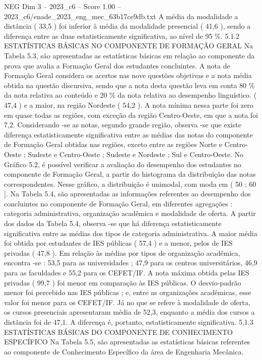 \begin{textsample}{NEG Dim 3 – 2023\_c6 – Score 1.00 – 2023\_c6/enade\_2023\_eng\_mec\_63b17ce9db.txt}
A média da modalidade a distância ( 33,5 ) foi inferior à média da modalidade presencial ( 41,6 ), sendo a diferença entre as duas estatisticamente significativa, ao nível de 95 \%. 5.1.2 ESTATÍSTICAS BÁSICAS NO COMPONENTE DE FORMAÇÃO GERAL Na Tabela 5.3, são apresentadas as estatísticas básicas em relação ao componente da prova que avalia a Formação Geral dos estudantes concluintes.
A nota de Formação Geral considera os acertos nas nove questões objetivas e a nota média obtida na questão discursiva, sendo que a nota desta questão leva em conta 80 \% da nota relativa ao conteúdo e 20 \% da nota relativa ao desempenho linguístico. ( 47,4 ) e a maior, na região Nordeste ( 54,2 ).
A nota mínima nessa parte foi zero em quase todas as regiões, com exceção da região Centro-Oeste, em que a nota foi 7,2.
Considerando -se as notas, segundo grande região, observa -se que existe diferença estatisticamente significativa entre as médias das notas do componente de Formação Geral obtidas nas regiões, exceto entre as regiões Norte e Centro-Oeste ; Sudeste e Centro-Oeste ; Sudeste e Nordeste ; Sul e Centro-Oeste.
No Gráfico 5.2, é possível verificar a avaliação do desempenho dos estudantes no componente de Formação Geral, a partir do histograma da distribuição das notas correspondentes.
Nesse gráfico, a distribuição é unimodal, com moda em ( 50 ; 60 ].
Na Tabela 5.4, são apresentadas as informações referentes ao desempenho dos concluintes no componente de Formação Geral, em diferentes agregações : categoria administrativa, organização acadêmica e modalidade de oferta.
A partir dos dados da Tabela 5.4, observa -se que há diferença estatisticamente significativa entre as médias dos tipos de categoria administrativa.
A maior média foi obtida por estudantes de IES públicas ( 57,4 ) e a menor, pelos de IES privadas ( 47,8 ).
Em relação às médias por tipos de organização acadêmica, encontra -se : 53,5 para as universidades ; 47,9 para os centros universitários, 46,9 para as faculdades e 55,2 para os CEFET/IF.
A nota máxima obtida pelas IES privadas ( 99,7 ) foi menor em comparação às IES públicas.
O desvio-padrão menor foi percebido nas IES públicas ; e, entre as organizações acadêmicas, esse valor foi menor para os CEFET/IF.
Já no que se refere à modalidade de oferta, os cursos presenciais apresentaram média de 52,3, enquanto a média dos cursos a distância foi de 47,1.
A diferença é, portanto, estatisticamente significativa. 5.1.3 ESTATÍSTICAS BÁSICAS DO COMPONENTE DE CONHECIMENTO ESPECÍFICO Na Tabela 5.5, são apresentadas as estatísticas básicas referentes ao componente de Conhecimento Específico da área de Engenharia Mecânica.

\end{textsample}
